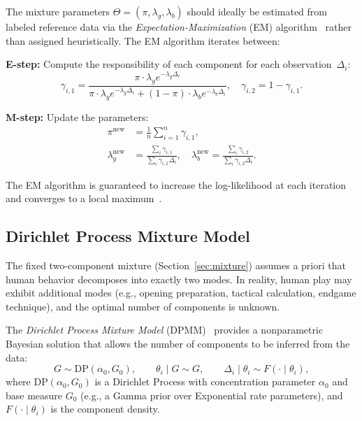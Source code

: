 \documentclass[11pt,a4paper]{article}
\begin{document}
The mixture parameters $\Theta = (\pi, \lambda_g, \lambda_b)$ should
ideally be estimated from labeled reference data via the
\emph{Expectation-Maximization} (EM) algorithm~\citep{dempster1977maximum}
rather than assigned heuristically. The EM algorithm iterates between:

\textbf{E-step:} Compute the responsibility of each component for each
observation~$\Delta_i$:
\begin{equation}
    \gamma_{i,1} = \frac{\pi \cdot \lambda_g e^{-\lambda_g \Delta_i}}
    {\pi \cdot \lambda_g e^{-\lambda_g \Delta_i}
    + (1-\pi) \cdot \lambda_b e^{-\lambda_b \Delta_i}}, \quad
    \gamma_{i,2} = 1 - \gamma_{i,1}.
    \label{eq:e_step}
\end{equation}

\textbf{M-step:} Update the parameters:
\begin{align}
    \pi^{\text{new}} &= \frac{1}{n}\sum_{i=1}^{n} \gamma_{i,1},
    \label{eq:m_step_pi}\\
    \lambda_g^{\text{new}} &= \frac{\sum_i \gamma_{i,1}}
    {\sum_i \gamma_{i,1} \Delta_i}, \quad
    \lambda_b^{\text{new}} = \frac{\sum_i \gamma_{i,2}}
    {\sum_i \gamma_{i,2} \Delta_i}.
    \label{eq:m_step_lambda}
\end{align}

The EM algorithm is guaranteed to increase the log-likelihood at each
iteration and converges to a local maximum~\citep{bishop2006pattern}.

\subsection{Dirichlet Process Mixture Model}
\label{sec:dpm}

The fixed two-component mixture (Section~\ref{sec:mixture}) assumes a priori
that human behavior decomposes into exactly two modes. In reality, human play
may exhibit additional modes (e.g., opening preparation, tactical
calculation, endgame technique), and the optimal number of components is
unknown.

The \emph{Dirichlet Process Mixture Model}
(DPMM)~\citep{ferguson1973bayesian, neal2000markov} provides a
nonparametric Bayesian solution that allows the number of components to be
inferred from the data:
\begin{equation}
    G \sim \text{DP}(\alpha_0, G_0), \qquad
    \theta_i \mid G \sim G, \qquad
    \Delta_i \mid \theta_i \sim F(\cdot \mid \theta_i),
    \label{eq:dpmm}
\end{equation}
where $\text{DP}(\alpha_0, G_0)$ is a Dirichlet Process with concentration
parameter $\alpha_0$ and base measure $G_0$ (e.g., a Gamma prior over
Exponential rate parameters), and $F(\cdot \mid \theta_i)$ is the component
density.
\end{document}
